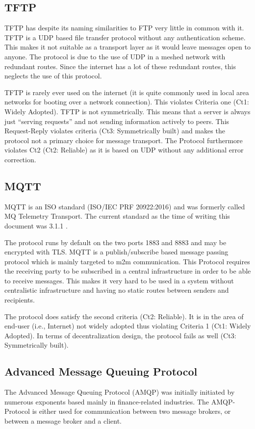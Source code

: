 \documentclass[a4paper,appendixprefix,pdfusetitle,twocolumn,fontsize=8pt,draft,DIV=calc]{scrbook}
\begin{document}
\subsection{TFTP}
TFTP has despite its naming similarities to FTP very little in common with it. TFTP is a UDP based file transfer protocol without any authentication scheme. This makes it not suitable as a transport layer as it would leave messages open to anyone. The protocol is due to the use of UDP in a meshed network with redundant routes. Since the internet has a lot of these redundant routes, this neglects the use of this protocol.

TFTP is rarely ever used on the internet (it is quite commonly used in local area networks for booting over a network connection). This violates Criteria one (Ct1: Widely Adopted). TFTP is not symmetrically. This means that a server is always just ``serving requests'' and not sending information actively to peers. This Request-Reply violates criteria (Ct3: Symmetrically built) and makes the protocol not a primary choice for message transport. The Protocol furthermore violates Ct2 (Ct2: Reliable) as it is based on UDP without any additional error correction.

\subsection{MQTT}
MQTT is an ISO standard (ISO/IEC PRF 20922:2016) and was formerly called MQ Telemetry Transport. The current standard as the time of writing this document was 3.1.1 \cite{mqtt}. 

The protocol runs by default on the two ports 1883 and 8883 and may be encrypted with TLS. MQTT is a publish/subscribe based message passing protocol which is mainly targeted to m2m communication. This Protocol requires the receiving party to be subscribed in a central infrastructure in order to be able to receive messages. This makes it very hard to be used in a system without centralistic infrastructure and having no static routes between senders and recipients.

The protocol does satisfy the second criteria (Ct2: Reliable). It is in the area of end-user (i.e., Internet) not widely adopted thus violating Criteria 1 (Ct1: Widely Adopted). In terms of decentralization design, the protocol fails as well (Ct3: Symmetrically built).

\subsection{Advanced Message Queuing Protocol}
The Advanced Message Queuing Protocol (AMQP) was initially initiated by numerous exponents based mainly in finance-related industries. The AMQP-Protocol is either used for communication between two message brokers, or between a message broker and a client\cite{amqp}.
\end{document}
